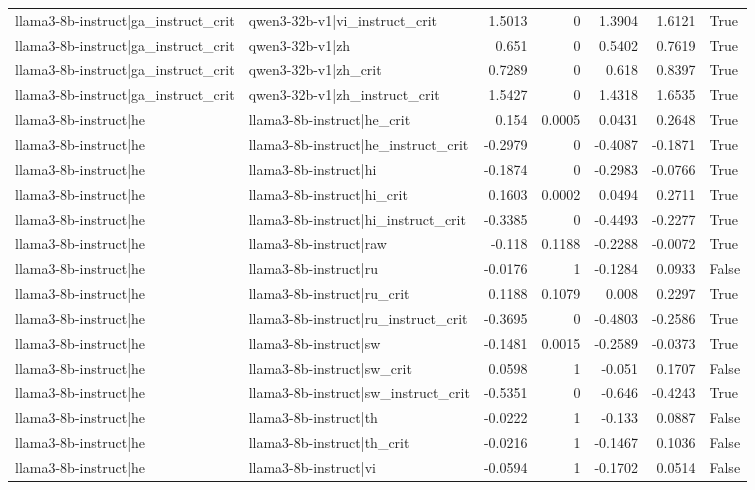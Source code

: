 \begin{table}
\begin{tabular}{l l r r r r l}
llama3-8b-instruct|ga_instruct_crit & qwen3-32b-v1|vi_instruct_crit & 1.5013 & 0 & 1.3904 & 1.6121 & True \\
llama3-8b-instruct|ga_instruct_crit & qwen3-32b-v1|zh & 0.651 & 0 & 0.5402 & 0.7619 & True \\
llama3-8b-instruct|ga_instruct_crit & qwen3-32b-v1|zh_crit & 0.7289 & 0 & 0.618 & 0.8397 & True \\
llama3-8b-instruct|ga_instruct_crit & qwen3-32b-v1|zh_instruct_crit & 1.5427 & 0 & 1.4318 & 1.6535 & True \\
llama3-8b-instruct|he & llama3-8b-instruct|he_crit & 0.154 & 0.0005 & 0.0431 & 0.2648 & True \\
llama3-8b-instruct|he & llama3-8b-instruct|he_instruct_crit & -0.2979 & 0 & -0.4087 & -0.1871 & True \\
llama3-8b-instruct|he & llama3-8b-instruct|hi & -0.1874 & 0 & -0.2983 & -0.0766 & True \\
llama3-8b-instruct|he & llama3-8b-instruct|hi_crit & 0.1603 & 0.0002 & 0.0494 & 0.2711 & True \\
llama3-8b-instruct|he & llama3-8b-instruct|hi_instruct_crit & -0.3385 & 0 & -0.4493 & -0.2277 & True \\
llama3-8b-instruct|he & llama3-8b-instruct|raw & -0.118 & 0.1188 & -0.2288 & -0.0072 & True \\
llama3-8b-instruct|he & llama3-8b-instruct|ru & -0.0176 & 1 & -0.1284 & 0.0933 & False \\
llama3-8b-instruct|he & llama3-8b-instruct|ru_crit & 0.1188 & 0.1079 & 0.008 & 0.2297 & True \\
llama3-8b-instruct|he & llama3-8b-instruct|ru_instruct_crit & -0.3695 & 0 & -0.4803 & -0.2586 & True \\
llama3-8b-instruct|he & llama3-8b-instruct|sw & -0.1481 & 0.0015 & -0.2589 & -0.0373 & True \\
llama3-8b-instruct|he & llama3-8b-instruct|sw_crit & 0.0598 & 1 & -0.051 & 0.1707 & False \\
llama3-8b-instruct|he & llama3-8b-instruct|sw_instruct_crit & -0.5351 & 0 & -0.646 & -0.4243 & True \\
llama3-8b-instruct|he & llama3-8b-instruct|th & -0.0222 & 1 & -0.133 & 0.0887 & False \\
llama3-8b-instruct|he & llama3-8b-instruct|th_crit & -0.0216 & 1 & -0.1467 & 0.1036 & False \\
llama3-8b-instruct|he & llama3-8b-instruct|vi & -0.0594 & 1 & -0.1702 & 0.0514 & False \\

\end{tabular}
\end{table}
